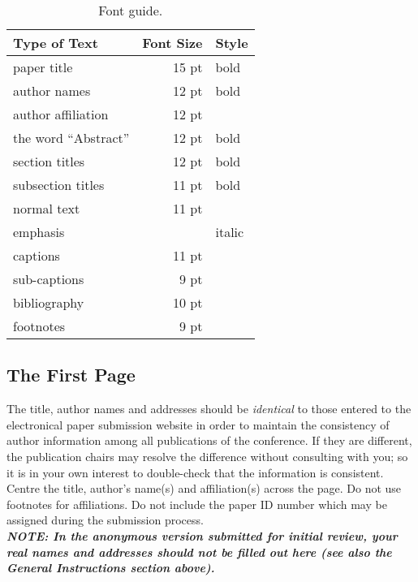 \documentclass[a4paper,11pt]{article}
\begin{document}
\begin{table}[htb]
\begin{center}
\begin{tabular}{|l|rl|}
\hline \bf Type of Text & \bf Font Size & \bf Style \\ \hline
paper title & 15 pt & bold \\
author names & 12 pt & bold \\
author affiliation & 12 pt & \\
the word ``Abstract'' & 12 pt & bold \\
section titles & 12 pt & bold \\
subsection titles & 11 pt & bold\\
normal text & 11 pt  &\\
emphasis & & italic\\
captions & 11 pt & \\
sub-captions & 9 pt & \\
bibliography & 10 pt & \\
footnotes & 9 pt & \\
\hline
\end{tabular}
\end{center}
\caption{\label{font-table} Font guide. }
\end{table}

\subsection{The First Page}
\label{ssec:first}

The title, author names and addresses should be \emph{identical}
to those entered to the electronical paper submission website in order
to maintain the consistency of author information among all
publications of the conference. If they are different, the publication
chairs may resolve the difference without consulting with you; so it
is in your own interest to double-check that the information is
consistent.
Centre the title, author's name(s) and affiliation(s) across
the page. Do not use footnotes for affiliations. Do not include the
paper ID number which may be assigned during the submission process.\\

\textbf{\emph{NOTE: In the anonymous version submitted for initial review, your real names and addresses
should \emph{not} be filled out here (see also the General Instructions section above).}}\\
\end{document}
